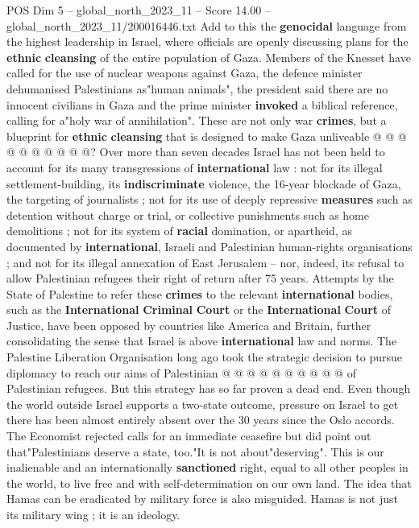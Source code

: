 \begin{textsample}{POS Dim 5 – global\_north\_2023\_11 – Score 14.00 – global\_north\_2023\_11/200016446.txt}
Add to this the \textbf{genocidal} language from the highest leadership in Israel, where officials are openly discussing plans for the \textbf{ethnic} \textbf{cleansing} of the entire population of Gaza.
Members of the Knesset have called for the use of nuclear weapons against Gaza, the defence minister dehumanised Palestinians as"human animals", the president said there are no innocent civilians in Gaza and the prime minister \textbf{invoked} a biblical reference, calling for a"holy war of annihilation".
These are not only war \textbf{crimes}, but a blueprint for \textbf{ethnic} \textbf{cleansing} that is designed to make Gaza unliveable @ @ @ @ @ @ @ @ @ @?
Over more than seven decades Israel has not been held to account for its many transgressions of \textbf{international} law : not for its illegal settlement-building, its \textbf{indiscriminate} violence, the 16-year blockade of Gaza, the targeting of journalists ; not for its use of deeply repressive \textbf{measures} such as detention without charge or trial, or collective punishments such as home demolitions ; not for its system of \textbf{racial} domination, or apartheid, as documented by \textbf{international}, Israeli and Palestinian human-rights organisations ; and not for its illegal annexation of East Jerusalem -- nor, indeed, its refusal to allow Palestinian refugees their right of return after 75 years.
Attempts by the State of Palestine to refer these \textbf{crimes} to the relevant \textbf{international} bodies, such as the \textbf{International} \textbf{Criminal} \textbf{Court} or the \textbf{International} \textbf{Court} of Justice, have been opposed by countries like America and Britain, further consolidating the sense that Israel is above \textbf{international} law and norms.
The Palestine Liberation Organisation long ago took the strategic decision to pursue diplomacy to reach our aims of Palestinian @ @ @ @ @ @ @ @ @ @ of Palestinian refugees.
But this strategy has so far proven a dead end.
Even though the world outside Israel supports a two-state outcome, pressure on Israel to get there has been almost entirely absent over the 30 years since the Oslo accords.
The Economist rejected calls for an immediate ceasefire but did point out that"Palestinians deserve a state, too."It is not about"deserving".
This is our inalienable and an internationally \textbf{sanctioned} right, equal to all other peoples in the world, to live free and with self-determination on our own land.
The idea that Hamas can be eradicated by military force is also misguided.
Hamas is not just its military wing ; it is an ideology.

\end{textsample}
